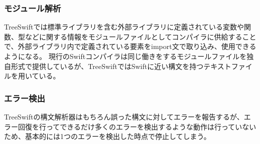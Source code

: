 \subsubsection{モジュール解析}

TreeSwiftでは標準ライブラリを含む外部ライブラリに定義されている変数や関数、型などに関する情報をモジュールファイルとしてコンパイラに供給することで、外部ライブラリ内で定義されている要素をimport文で取り込み、使用できるようになる。
現行のSwiftコンパイラは同じ働きをするモジュールファイルを独自形式で提供しているが、TreeSwiftではSwiftに近い構文を持つテキストファイルを用いている。

\subsubsection{エラー検出}

TreeSwiftの構文解析器はもちろん誤った構文に対してエラーを報告するが、エラー回復を行ってできるだけ多くのエラーを検出するような動作は行っていないため、基本的には1つのエラーを検出した時点で停止してしまう。

